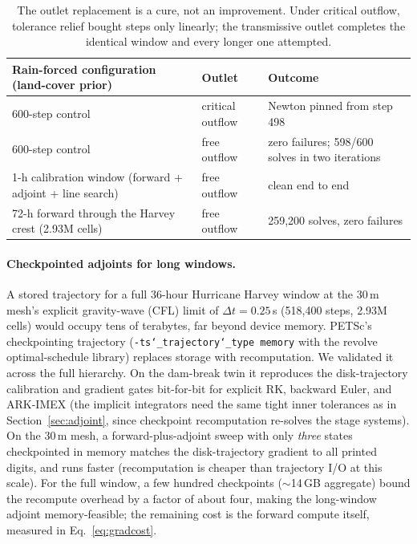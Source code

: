 \documentclass[11pt]{article}
\begin{document}
\begin{table}
\centering\footnotesize
\begin{tabular}{@{}p{6.4cm}lp{5.4cm}@{}}
\toprule
Rain-forced configuration (land-cover prior) & Outlet & Outcome \\
\midrule
600-step control & critical outflow & Newton pinned from step 498 \\
600-step control & free outflow & zero failures; 598/600 solves in two iterations \\
1-h calibration window (forward + adjoint + line search) & free outflow & clean end to end \\
72-h forward through the Harvey crest (2.93M cells) & free outflow & 259{,}200 solves, zero failures \\
\bottomrule
\end{tabular}
\caption{The outlet replacement is a cure, not an improvement. Under
critical outflow, tolerance relief bought steps only linearly; the
transmissive outlet completes the identical window and every longer
one attempted.}
\label{tab:cure}
\end{table}

\paragraph{Checkpointed adjoints for long windows.}
A stored trajectory for a full 36-hour Hurricane Harvey window
at the 30\,m mesh's explicit gravity-wave (CFL) limit of
$\Delta t = 0.25$\,s (518{,}400 steps, 2.93M cells) would occupy tens
of terabytes, far beyond device memory. PETSc's checkpointing
trajectory (\texttt{-ts\char`\_trajectory\char`\_type memory} with the revolve
optimal-schedule library) replaces storage with recomputation. We
validated it across the full hierarchy. On the dam-break twin it
reproduces the disk-trajectory calibration and gradient gates
bit-for-bit for explicit RK, backward Euler, and ARK-IMEX (the
implicit integrators need the same tight inner tolerances as in
Section~\ref{sec:adjoint}, since checkpoint recomputation re-solves
the stage systems). On the 30\,m mesh, a forward-plus-adjoint sweep
with only \emph{three} states checkpointed in memory matches the
disk-trajectory gradient to all printed digits, and runs faster
(recomputation is cheaper than trajectory I/O at this scale). For the
full window, a few hundred checkpoints ($\sim$14\,GB aggregate) bound
the recompute overhead by a factor of about four, making the
long-window adjoint memory-feasible; the remaining cost is the forward
compute itself, measured in Eq.~\eqref{eq:gradcost}.
\end{document}
